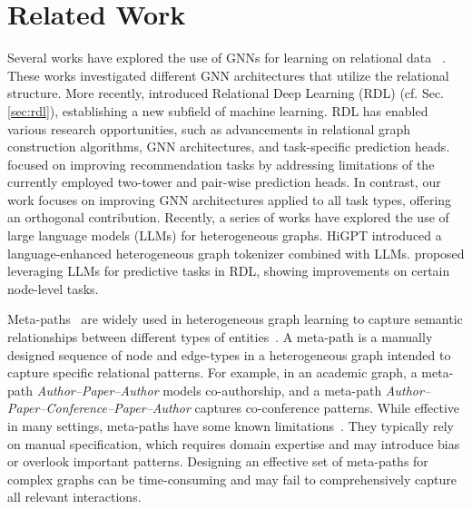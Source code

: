 \documentclass{article}
\theoremstyle{plain}
\theoremstyle{definition}
\theoremstyle{remark}
\begin{document}
\section{Related Work}
\label{sec: related_work}
  Several works have explored the use of GNNs for learning on relational data ~\citep{schlichtkrull2018relational, cvitkovic2020supervisedrd, vsir2021deep, zahradnik2023deep,kanatsoulis2025learning}. These works investigated different GNN architectures that utilize the relational structure. More recently, \citet{fey2023relational} introduced Relational Deep Learning (RDL) (cf. Sec. \ref{sec:rdl}), establishing a new subfield of machine learning. RDL has enabled various research opportunities, such as advancements in relational graph construction algorithms, GNN architectures, and task-specific prediction heads. \citet{yuan2024contextgnn} focused on improving recommendation tasks by addressing limitations of the currently employed two-tower and pair-wise prediction heads. In contrast, our work focuses on improving GNN architectures applied to all task types, offering an orthogonal contribution. 
Recently, a series of works have explored the use of large language models (LLMs) for heterogeneous graphs. HiGPT  \citep{tang2024higpt} introduced a language-enhanced heterogeneous graph tokenizer combined with LLMs. \citet{wydmuch2024tackling}  proposed leveraging LLMs for predictive tasks in RDL, showing improvements on certain node-level tasks.

\vspace{-5pt}
  Meta-paths~\citep{sun2011pathsim} are widely used in heterogeneous graph learning to capture semantic relationships between different types of entities~\citep{shang2016meta,dong2017metapath2vec,hu2018leveraging,shi2018easing,wang2019heterogeneous,fu2020magnn}. A meta-path is a manually designed sequence of node and edge-types in a heterogeneous graph intended to capture specific relational patterns. For example, in an academic graph, a meta-path \textit{Author–Paper–Author} models co-authorship, and a meta-path \textit{Author–Paper–Conference–Paper–Author} captures co-conference patterns. While effective in many settings, meta-paths have some known limitations~\citep{shi2016survey,hu2020heterogeneous,GNNBook-ch16-shi}. They typically rely on manual specification, which requires domain expertise and may introduce bias or overlook important patterns.  Designing an effective set of meta-paths for complex graphs can be time-consuming and may fail to comprehensively capture all relevant interactions.
\end{document}
